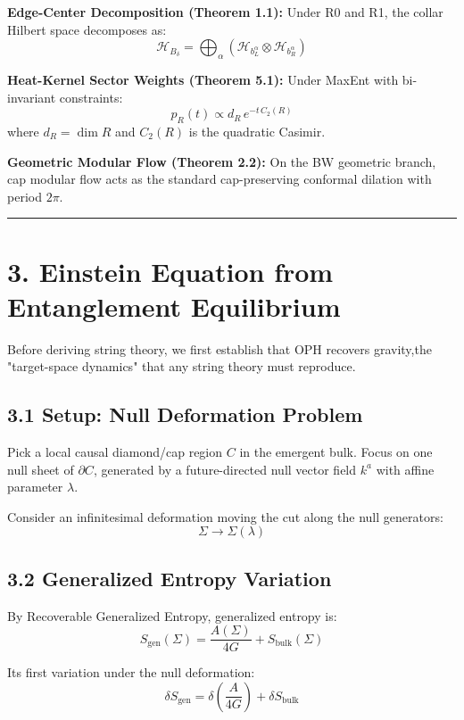 \textbf{Edge-Center Decomposition (Theorem 1.1):} Under R0 and R1, the collar Hilbert space decomposes as: \[\mathcal{H}_{B_\delta} = \bigoplus_{\alpha} \left(\mathcal{H}_{b_L^\alpha} \otimes \mathcal{H}_{b_R^\alpha}\right)\]

\textbf{Heat-Kernel Sector Weights (Theorem 5.1):} Under MaxEnt with bi-invariant constraints: \[p_R(t) \propto d_R \, e^{-t \, C_2(R)}\] where \(d_R = \dim R\) and \(C_2(R)\) is the quadratic Casimir.

\textbf{Geometric Modular Flow (Theorem 2.2):} On the BW geometric branch, cap modular flow acts as the standard cap-preserving conformal dilation with period \(2\pi\).

\begin{center}\rule{0.5\linewidth}{0.5pt}\end{center}

\section{3. Einstein Equation from Entanglement Equilibrium}\label{3-einstein-equation-from-entanglement-equilibrium}

Before deriving string theory, we first establish that OPH recovers gravity,the "target-space dynamics" that any string theory must reproduce.

\subsection{3.1 Setup: Null Deformation Problem}\label{31-setup-null-deformation-problem}

Pick a local causal diamond/cap region \(C\) in the emergent bulk. Focus on one null sheet of \(\partial C\), generated by a future-directed null vector field \(k^a\) with affine parameter \(\lambda\).

Consider an infinitesimal deformation moving the cut along the null generators: \[\Sigma \to \Sigma(\lambda)\]

\subsection{3.2 Generalized Entropy Variation}\label{32-generalized-entropy-variation}

By Recoverable Generalized Entropy, generalized entropy is: \[S_{\text{gen}}(\Sigma) = \frac{A(\Sigma)}{4G} + S_{\text{bulk}}(\Sigma)\]

Its first variation under the null deformation: \[\delta S_{\text{gen}} = \delta\left(\frac{A}{4G}\right) + \delta S_{\text{bulk}}\]

